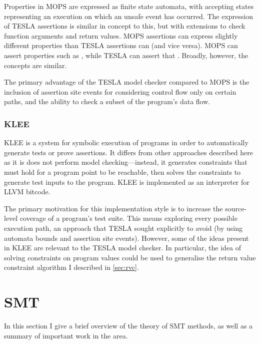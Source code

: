 Properties in MOPS are expressed as finite state automata, with accepting states
representing an execution on which an unsafe event has occurred. The expression
of TESLA assertions is similar in concept to this, but with extensions to check
function arguments and return values. MOPS assertions can express slightly
different properties than TESLA assertions can (and vice versa). MOPS can assert
properties such as , while TESLA can assert that
. Broadly, however, the concepts are similar.

The primary advantage of the TESLA model checker compared to MOPS is the
inclusion of assertion site events for considering control flow only on certain
paths, and the ability to check a subset of the program's data flow.

\subsubsection{KLEE}

KLEE \cite{cadar_klee:_2008} is a system for symbolic execution of programs in
order to automatically generate tests or prove assertions. It differs from other
approaches described here as it is does not perform model checking---instead, it
generates constraints that must hold for a program point to be reachable, then
solves the constraints to generate test inputs to the program. KLEE is
implemented as an interpreter for LLVM bitcode.

The primary motivation for this implementation style is to increase the
source-level coverage of a program's test suite. This means exploring every
possible execution path, an approach that TESLA sought explicitly to avoid (by
using automata bounds and assertion site events). However, some of the ideas
present in KLEE are relevant to the TESLA model checker. In particular, the idea
of solving constraints on program values could be used to generalise the return
value constraint algorithm I described in \autoref{sec:rvc}.

\section{SMT} \label{sec:smt}

In this section I give a brief overview of the theory of SMT methods, as well as
a summary of important work in the area.

